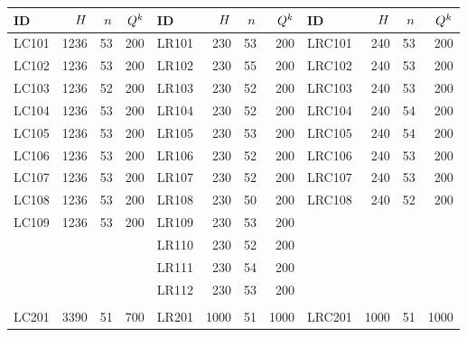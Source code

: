 \begin{footnotesize}
\begin{center}
\begin{longtable}{lrrr|lrrr|lrrr}
        \hline
        ID & $H$ & $n$ & $Q^{k}$ & 
        ID & $H$ & $n$ & $Q^{k}$ & 
        ID & $H$ & $n$ & $Q^{k}$ \\ 
        \hline
        LC101      & 1236 &  53 & 200 & LR101      &  230 &  53 &  200 & LRC101      &  240 &  53 &  200\\
        LC102      & 1236 &  53 & 200 & LR102      &  230 &  55 &  200 & LRC102      &  240 &  53 &  200\\
        LC103      & 1236 &  52 & 200 & LR103      &  230 &  52 &  200 & LRC103      &  240 &  53 &  200\\
        LC104      & 1236 &  53 & 200 & LR104      &  230 &  52 &  200 & LRC104      &  240 &  54 &  200\\
        LC105      & 1236 &  53 & 200 & LR105      &  230 &  53 &  200 & LRC105      &  240 &  54 &  200\\
        LC106      & 1236 &  53 & 200 & LR106      &  230 &  52 &  200 & LRC106      &  240 &  53 &  200\\
        LC107      & 1236 &  53 & 200 & LR107      &  230 &  52 &  200 & LRC107      &  240 &  53 &  200\\
        LC108      & 1236 &  53 & 200 & LR108      &  230 &  50 &  200 & LRC108      &  240 &  52 &  200\\
        LC109      & 1236 &  53 & 200 & LR109      &  230 &  53 &  200 &             &      &     &     \\ 
                   &      &     &     & LR110      &  230 &  52 &  200 &             &      &     &     \\ 
                   &      &     &     & LR111      &  230 &  54 &  200 &             &      &     &     \\
                   &      &     &     & LR112      &  230 &  53 &  200 &             &      &     &     \\
                   &      &     &     &            &      &     &      &             &      &     &     \\
        LC201      & 3390 &  51 & 700 & LR201      & 1000 &  51 & 1000 & LRC201      & 1000 &  51 & 1000\\

\end{longtable}
\end{center}
\end{footnotesize}
